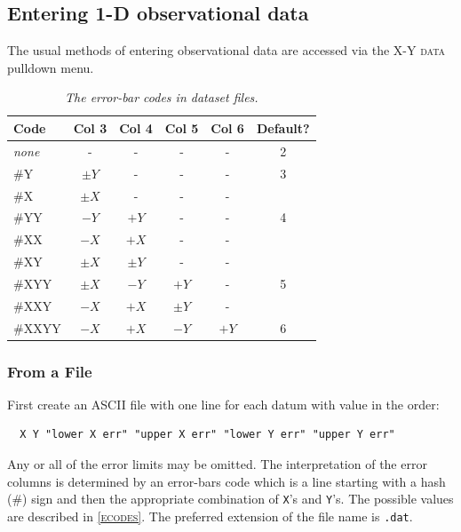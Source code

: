 \documentclass[11pt,twoside,english]{article}
\begin{document}
\subsection{Entering 1-D observational data\label{enter-1d}}

The usual methods of entering observational data are accessed via the
\textsc{X-Y data} pulldown menu.

\begin{table}[!ht]

  \caption{\label{ecodes}\textit{The error-bar codes in dataset files.}}

  \begin{center}
    \begin{tabular}{|l|cccc|c|}
      \hline 
      Code&Col 3&Col 4&Col 5&Col 6&Default?\\
      \hline
      \textit{none} & - & - & - & - & 2 \\
      \#Y&$\pm Y$&-&-&-&3\\
      \#X&$\pm X$&-&-&-&\\
      \#YY&$-Y$&$+Y$&-&-&4\\
      \#XX&$-X$&$+X$&-&-&\\
      \#XY&$\pm X$&$\pm Y$&-&-&\\
      \#XYY&$\pm X$&$-Y$&$+Y$&-&5\\
      \#XXY&$-X$&$+X$&$\pm Y$&-&\\
      \#XXYY&$-X$&$+X$&$-Y$&$+Y$&6\\
      \hline
    \end{tabular}
  \end{center}
\end{table}

\subsubsection{From a File}

First create an ASCII file with one line for each datum with value in
the order:

\begin{verbatim}
  X Y "lower X err" "upper X err" "lower Y err" "upper Y err"
\end{verbatim}
Any or all of the error limits may be omitted. The interpretation of
the error columns is determined by an error-bars code which is a line
starting with a hash (\#) sign and then the appropriate combination of
\texttt{X}'s and \texttt{Y}'s. The possible values are described in
\textsc{\autoref{ecodes}}. The preferred extension of the file name is
\texttt{.dat}.
\end{document}
